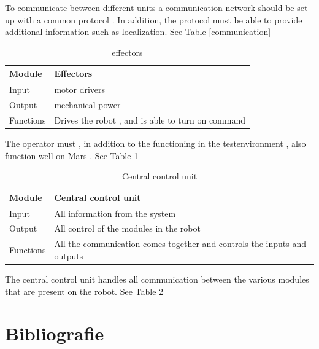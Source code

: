 \documentclass[10pt,a4paper]{article}
\begin{document}
To communicate between different units a communication network should be set up with a common protocol . In addition, the protocol must be able to provide additional information such as localization. See Table \ref{communication} \\

\begin{table}[H]
\centering
\caption{effectors}
\label{Effectors}
\begin{tabular}{|l|l|}
\hline
Module    & Effectors \\ \hline
Input  & motor drivers  \\ \hline
Output & mechanical power   \\ \hline
Functions  & Drives the robot , and is able to turn on command            \\ \hline
\end{tabular}
\end{table}

The operator must , in addition to the functioning in the testenvironment , also function well on Mars . See Table \ref{Effectors} \\

\begin{table}[H]
\centering
\caption{Central control unit}
\label{control}
\begin{tabular}{|l|l|}
\hline
Module    & Central control unit \\ \hline
Input  & All information from the system  \\ \hline
Output & All control of the modules in the robot \\ \hline
Functions  & All the communication comes together and controls the inputs and outputs            \\ \hline
\end{tabular}
\end{table}

The central control unit handles all communication between the various modules that are present on the robot. See Table \ref{control}

\newpage

\section{Bibliografie}


\end{document}
